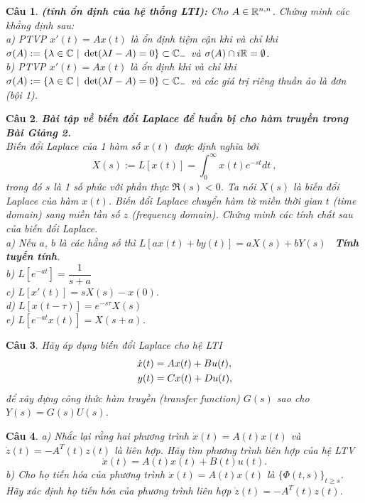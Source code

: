 \documentclass[11pt]{article}
\newtheorem{bt}{Câu}
\begin{document}
\newpage 

\begin{bt} \textbf{(tính ổn định của hệ thống LTI):} Cho $A \in \mathbb{R}^{n,n}$. Chứng minh các khẳng định sau: \\
a) PTVP $x'(t) = Ax(t)$ là ổn định tiệm cận khi và chỉ khi $\sigma(A) := \{ \lambda \in \mathbb{C} \ | \ \det(\lambda I-A) = 0\} \subset \mathbb{C}_{-}$ và $\sigma(A) \cap i\mathbb{R} = \emptyset$. \\
b) PTVP $x'(t) = Ax(t)$ là ổn định khi và chỉ khi $\sigma(A) := \{ \lambda \in \mathbb{C} \ | \ \det(\lambda I-A) = 0\} \subset \mathbb{C}_{-}$ và các giá trị riêng thuần ảo là đơn (bội 1).
\end{bt}   

\begin{bt} \textbf{Bài tập về biến đổi Laplace để huẩn bị cho hàm truyền trong Bài Giảng 2.} \\
Biến đổi Laplace của 1 hàm số $x(t)$ được định nghĩa bởi
%
\[
X(s) := L[x(t)] = \int_0^{\infty} x(t) e^{-st} dt \ , 
\]
%
trong đó $s$ là 1 số phức với phần thực $\Re(s)<0$. Ta nói $X(s)$ là biến đổi Laplace của hàm $x(t)$. Biến đổi Laplace chuyển hàm từ miền thời gian $t$ (time domain) sang miền tần số $z$ (frequency domain). Chứng minh các tính chất sau của biến đổi Laplace. \\
a) Nếu $a$, $b$ là các hằng số thì $L[ax(t) + by(t)] = a X(s) + b Y(s)$ \ \textbf{Tính tuyến tính}. \\
b) $L[e^{-at}] = \dfrac{1}{s+a}$ \\
c) $L[x'(t)] = s X(s) - x(0)$. \\
d) $L[x(t-\tau)] = e^{-s\tau} X(s)$ \\
e) $L[e^{-at} x(t)] = X(s+a)$. 
\end{bt}   

\begin{bt}
Hãy áp dụng biến đổi Laplace cho hệ LTI 
%
\begin{align}\label{3}
\dot{x}(t) &= A x(t) + B u(t), \notag \\
y(t) &= Cx(t) + Du(t),
\end{align}
%
để xây dựng công thức hàm truyền (transfer function) $G(s)$ sao cho $Y(s) = G(s) U(s)$.
\end{bt}


\begin{bt} 
a) Nhắc lại rằng hai phương trình $\dot{x}(t) = A(t) x(t)$	và $\dot{z}(t) = -A^T(t) z(t)$ là \emph{liên hợp}. Hãy tìm phương trình liên hợp của hệ LTV
%
\begin{equation}\label{3}
	\dot{x}(t) = A(t) x(t) + B(t) u(t).
\end{equation}
%
b) Cho họ tiến hóa của phương trình $\dot{x}(t) = A(t) x(t)$ là $\{\Phi(t,s)\}_{t\geq s}$. Hãy xác định họ tiến hóa của phương trình liên hợp $\dot{z}(t) = -A^T(t) z(t)$.
\end{bt}
\end{document}
